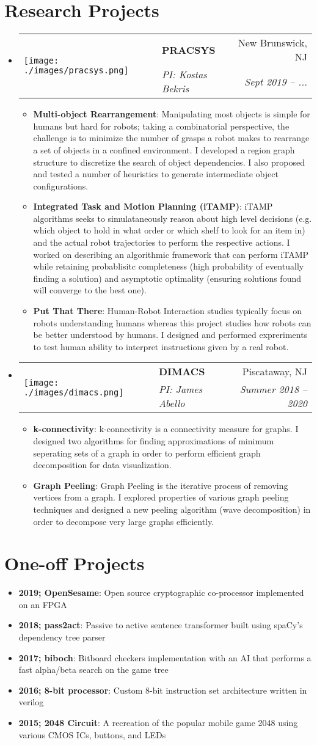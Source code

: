 \documentclass[letterpaper,11pt]{article}
\makeatletter
\newcommand{\resumeItem}[2]{
\item\small{
		\textbf{#1}{: #2 \vspace{-2pt}}
	}
}
\newcommand{\resumeSubheading}[5]{
	\vspace{-1pt}\item
	\begin{tabular*}{0.97\textwidth}[t]{ll@{\extracolsep{\fill}}r}
		\multirow{2}{*}{#1} & \textbf{#2} & #3 \\
				    & \textit{\small#4} & \textit{\small #5} \\
	\end{tabular*}\vspace{-5pt}
}
\newcommand{\resumeSubItem}[2]{\resumeItem{#1}{#2}\vspace{-4pt}}
\newcommand{\resumeSubHeadingListStart}{\begin{itemize}[leftmargin=*,label=]}
\newcommand{\resumeSubHeadingListEnd}{\end{itemize}}
\newcommand{\resumeItemListStart}{\begin{itemize}[label=$\bullet$]}
\newcommand{\resumeItemListEnd}{\end{itemize}\vspace{-5pt}}
\makeatother
\begin{document}
\section{Research Projects}
\resumeSubHeadingListStart
\resumeSubheading
{\texttt{[image: ./images/pracsys.png]}}
{PRACSYS}{New Brunswick, NJ}
{PI: Kostas Bekris}{Sept 2019 -- ...}
\resumeItemListStart
\resumeItem{Multi-object Rearrangement}
{Manipulating most objects is simple for humans but hard for robots; taking a combinatorial perspective, the challenge is to minimize the number of grasps a robot makes to rearrange a set of objects in a confined environment. I developed a region graph structure to discretize the search of object dependencies. I also proposed and tested a number of heuristics to generate intermediate object configurations.}
\resumeItem{Integrated Task and Motion Planning (iTAMP)}
{iTAMP algorithms seeks to simulataneously reason about high level decisions (e.g. which object to hold in what order or which shelf to look for an item in) and the actual robot trajectories to perform the respective actions. I worked on describing an algorithmic framework that can perform iTAMP while retaining probablisitc completeness (high probability of eventually finding a solution) and asymptotic optimality (ensuring solutions found will converge to the best one).}
\resumeItem{Put That There}
{Human-Robot Interaction studies typically focus on robots understanding humans whereas this project studies how robots can be better understood by humans. I designed and performed expreriments to test human ability to interpret instructions given by a real robot.}
\resumeItemListEnd
\resumeSubheading
{\texttt{[image: ./images/dimacs.png]}}
{DIMACS}{Piscataway, NJ}
{PI: James Abello}{Summer 2018 -- 2020}
\resumeItemListStart
\resumeItem{k-connectivity}
{k-connectivity is a connectivity measure for graphs. I designed two algorithms for finding approximations of minimum seperating sets of a graph in order to perform efficient graph decomposition for data visualization.}
\resumeItem{Graph Peeling}
{Graph Peeling is the iterative process of removing vertices from a graph. I explored properties of various graph peeling techniques and designed a new peeling algorithm (wave decomposition) in order to decompose very large graphs efficiently.}
\resumeItemListEnd
\resumeSubHeadingListEnd

\section{One-off Projects}
\resumeSubHeadingListStart
\resumeSubItem{2019; OpenSesame}
{Open source cryptographic co-processor implemented on an FPGA}
\resumeSubItem{2018; pass2act}
{Passive to active sentence transformer built using spaCy's dependency tree parser}
\resumeSubItem{2017; biboch}
{Bitboard checkers implementation with an AI that performs a fast alpha/beta search on the game tree}
\resumeSubItem{2016; 8-bit processor}
{Custom 8-bit instruction set architecture written in verilog}
\resumeItem{2015; 2048 Circuit}
{A recreation of the popular mobile game 2048 using various CMOS ICs, buttons, and LEDs}
\resumeSubHeadingListEnd
\end{document}
